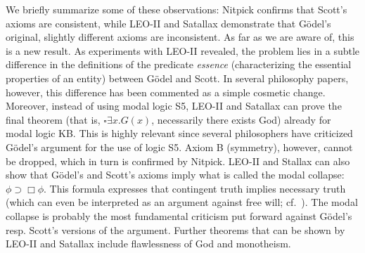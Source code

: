 \documentclass{llncs}
\begin{document}
We briefly summarize some of these observations: Nitpick confirms that
Scott's axioms are consistent, while LEO-II and Satallax demonstrate that
Gödel's original, slightly different axioms are inconsistent. As far
as we are aware of, this is a new result. As experiments with LEO-II
revealed, the problem lies in a subtle difference in the definitions
of the predicate \textit{essence} (characterizing the essential
properties of an entity) between Gödel and Scott. In several philosophy papers, however, this
difference has been commented as a simple cosmetic change.  Moreover,
instead of using modal logic S5, 
LEO-II and Satallax can prove the final theorem (that is,
$\square \exists x . G(x)$, necessarily there exists God) already for
modal logic KB.  This is highly relevant since several philosophers
have criticized G{\"o}del's argument for the use of logic S5.  Axiom
B (symmetry), however, cannot be dropped, which in turn is confirmed by Nitpick.
LEO-II and Stallax can also show that G{\"o}del's and Scott's axioms
imply what is called the modal collapse: $\phi\supset\Box\phi$. This
formula expresses that contingent truth implies necessary truth (which
can even be interpreted as an argument against free will;
cf.~\cite{sobel2004logic}). The modal collapse is probably the most
fundamental criticism put forward against G{\"o}del's resp. Scott's
versions of the argument. Further theorems that can be shown by LEO-II
and Satallax include flawlessness of God and monotheism. 
\end{document}
